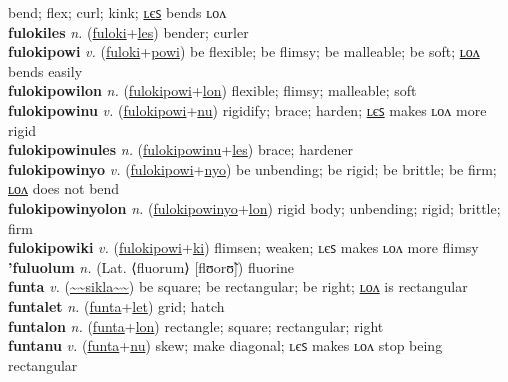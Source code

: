 bend; flex; curl; kink; \hyperref[fulokiles]{ʟєꜱ} bends ʟᴏᴧ \label{fuloki} \\
\textbf{fulokiles} \textit{n.} (\hyperref[fuloki]{fuloki}+\hyperref[les]{les})
bender; curler \label{fulokiles} \\
\textbf{fulokipowi} \textit{v.} (\hyperref[fuloki]{fuloki}+\hyperref[powi]{powi})
be flexible; be flimsy; be malleable; be soft; \hyperref[fulokipowilon]{ʟᴏᴧ} bends easily \label{fulokipowi} \\
\textbf{fulokipowilon} \textit{n.} (\hyperref[fulokipowi]{fulokipowi}+\hyperref[lon]{lon})
flexible; flimsy; malleable; soft \label{fulokipowilon} \\
\textbf{fulokipowinu} \textit{v.} (\hyperref[fulokipowi]{fulokipowi}+\hyperref[nu]{nu})
rigidify; brace; harden; \hyperref[fulokipowinules]{ʟєꜱ} makes ʟᴏᴧ more rigid \label{fulokipowinu} \\
\textbf{fulokipowinules} \textit{n.} (\hyperref[fulokipowinu]{fulokipowinu}+\hyperref[les]{les})
brace; hardener \label{fulokipowinules} \\
\textbf{fulokipowinyo} \textit{v.} (\hyperref[fulokipowi]{fulokipowi}+\hyperref[nyo]{nyo})
be unbending; be rigid; be brittle; be firm; \hyperref[fulokipowinyolon]{ʟᴏᴧ} does not bend \label{fulokipowinyo} \\
\textbf{fulokipowinyolon} \textit{n.} (\hyperref[fulokipowinyo]{fulokipowinyo}+\hyperref[lon]{lon})
rigid body; unbending; rigid; brittle; firm \label{fulokipowinyolon} \\
\textbf{fulokipowiki} \textit{v.} (\hyperref[fulokipowi]{fulokipowi}+\hyperref[ki]{ki})
flimsen; weaken; ʟєꜱ makes ʟᴏᴧ more flimsy \label{fulokipowiki} \\
\textbf{'fuluolum} \textit{n.} (Lat. ⟨fluorum⟩ [flʊorʊ̃])
fluorine \label{'fuluolum} \\
\textbf{funta} \textit{v.} (\hyperref[sikla]{\~{}\~{}sikla\~{}\~{}})
be square; be rectangular; be right; \hyperref[funtalon]{ʟᴏᴧ} is rectangular \label{funta} \\
\textbf{funtalet} \textit{n.} (\hyperref[funta]{funta}+\hyperref[let]{let})
grid; hatch \label{funtalet} \\
\textbf{funtalon} \textit{n.} (\hyperref[funta]{funta}+\hyperref[lon]{lon})
rectangle; square; rectangular; right \label{funtalon} \\
\textbf{funtanu} \textit{v.} (\hyperref[funta]{funta}+\hyperref[nu]{nu})
skew; make diagonal; ʟєꜱ makes ʟᴏᴧ stop being rectangular \label{funtanu} \\
